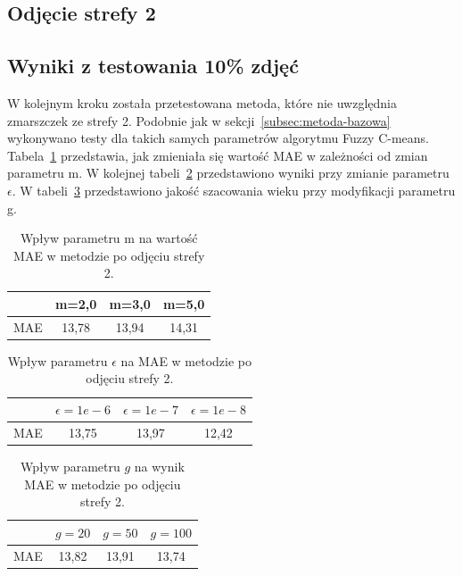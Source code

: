 \documentclass[a4paper,twoside,12pt]{book}
\begin{document}
    \subsection{Odjęcie strefy 2}\label{subsec:odjęcie-strefy-2}
    \subsection*{Wyniki z testowania 10\% zdjęć}
    W kolejnym kroku została przetestowana metoda, które nie uwzględnia zmarszczek ze strefy 2.
    Podobnie jak w sekcji~\ref{subsec:metoda-bazowa} wykonywano testy dla takich samych parametrów algorytmu Fuzzy
    C-means.
    Tabela~\ref{tab.odjeta_m} przedstawia, jak zmieniała się wartość MAE w zależności od zmian parametru m.
    W kolejnej tabeli~\ref{tab.odjeta_e} przedstawiono wyniki przy
    zmianie parametru $\epsilon$.
    W tabeli~\ref{tab.odjeta_g} przedstawiono
    jakość szacowania
    wieku przy modyfikacji parametru g.
    \begin{table}[h!]
        \centering
        \caption{Wpływ parametru m na wartość MAE w metodzie po odjęciu strefy 2.}
        \begin{tabular}{|c|c|c|c|}
            \hline
            & m=2,0 & m=3,0 & m=5,0 \\ \hline
            MAE & 13,78 & 13,94 & 14,31 \\ \hline
        \end{tabular}
        \label{tab.odjeta_m}
    \end{table}
    \begin{table}[h!]
        \centering
        \caption{Wpływ parametru $\epsilon$ na MAE w metodzie po odjęciu strefy 2.}
        \begin{tabular}{|c|c|c|c|}
            \hline
            & $\epsilon=1e-6$ & $\epsilon=1e-7$ & $\epsilon=1e-8$ \\ \hline
            MAE & 13,75 & 13,97 & 12,42 \\ \hline
        \end{tabular}
        \label{tab.odjeta_e}
    \end{table}
    \begin{table}[h!]
        \centering
        \caption{Wpływ parametru $g$ na wynik MAE w metodzie po odjęciu strefy 2.}
        \begin{tabular}{|c|c|c|c|}
            \hline
            & $g=20$ & $g=50$ & $g=100$ \\ \hline
            MAE & 13,82 & 13,91 & 13,74 \\ \hline
        \end{tabular}
        \label{tab.odjeta_g}
    \end{table}
\end{document}

